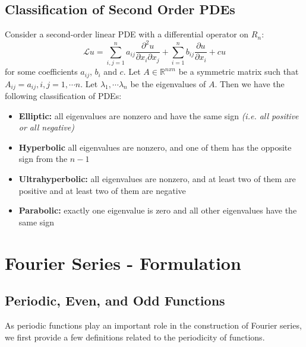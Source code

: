 \documentclass[11pt]{article}
\newcommand{\Lagr}{\mathcal{L}}
\newcommand{\R}{\mathbb{R}}
\begin{document}
\subsection{Classification of Second Order PDEs}
Consider a second-order linear PDE with a differential operator on $R_n$:
$$ \Lagr u = \sum_{i,j=1}^n a_{ij} \frac{\partial ^2u}{\partial x_i \partial x_j} + \sum_{i=1}^n b_{ij} \frac{\partial u}{\partial x_i } + cu $$
for some coefficients $a_{ij}$, $b_i$ and $c$. Let $A \in \R ^{nxn}$ be a symmetric matrix such that $A_{ij} = a_{ij},  i, j = 1, \cdots  n$.  Let $\lambda_1, \cdots \lambda_n$ be the eigenvalues of $A$. Then we have the following classification of PDEs:
\begin{itemize}
\item \textbf{Elliptic:} all eigenvalues are nonzero and have the same sign\textit{ (i.e.  all positive or all negative)}
\item \textbf{Hyperbolic} all eigenvalues are nonzero, and one of them has the opposite sign from the $n-1$
\item \textbf{Ultrahyperbolic:} all eigenvalues are nonzero, and at least two of them are positive and at least two of them are negative
\item \textbf{Parabolic:} exactly one eigenvalue is zero and all other eigenvalues have the same sign
\end{itemize}

\pagebreak



\section{Fourier Series - Formulation}

\subsection{Periodic, Even, and Odd Functions}
As periodic functions play an important role in the construction of Fourier series, we first provide a few definitions related to the periodicity of functions.
\end{document}
